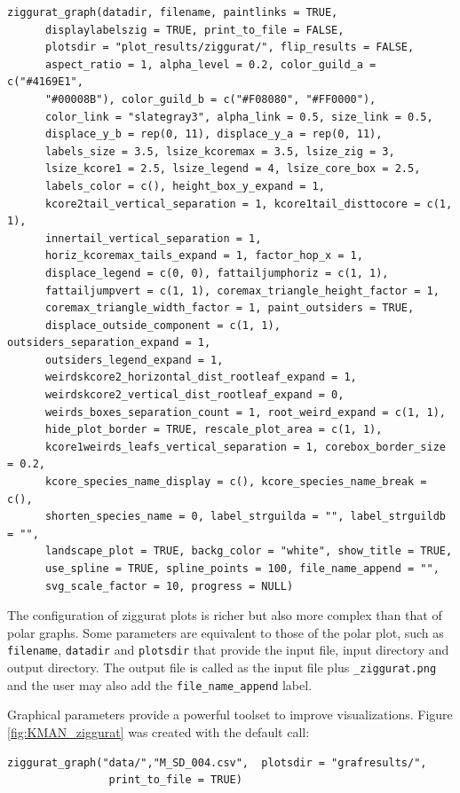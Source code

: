 \documentclass[12pt]{article}
\begin{document}
\fontsize{3.5mm}{3.5mm}\selectfont
\begin{verbatim}
ziggurat_graph(datadir, filename, paintlinks = TRUE,
	  displaylabelszig = TRUE, print_to_file = FALSE,
	  plotsdir = "plot_results/ziggurat/", flip_results = FALSE,
	  aspect_ratio = 1, alpha_level = 0.2, color_guild_a = c("#4169E1",
	  "#00008B"), color_guild_b = c("#F08080", "#FF0000"),
	  color_link = "slategray3", alpha_link = 0.5, size_link = 0.5,
	  displace_y_b = rep(0, 11), displace_y_a = rep(0, 11), 
	  labels_size = 3.5, lsize_kcoremax = 3.5, lsize_zig = 3, 
	  lsize_kcore1 = 2.5, lsize_legend = 4, lsize_core_box = 2.5, 
	  labels_color = c(), height_box_y_expand = 1, 
	  kcore2tail_vertical_separation = 1, kcore1tail_disttocore = c(1, 1), 
	  innertail_vertical_separation = 1,
	  horiz_kcoremax_tails_expand = 1, factor_hop_x = 1,
	  displace_legend = c(0, 0), fattailjumphoriz = c(1, 1),
	  fattailjumpvert = c(1, 1), coremax_triangle_height_factor = 1,
	  coremax_triangle_width_factor = 1, paint_outsiders = TRUE,
	  displace_outside_component = c(1, 1), outsiders_separation_expand = 1,
	  outsiders_legend_expand = 1,
	  weirdskcore2_horizontal_dist_rootleaf_expand = 1,
	  weirdskcore2_vertical_dist_rootleaf_expand = 0,
	  weirds_boxes_separation_count = 1, root_weird_expand = c(1, 1),
	  hide_plot_border = TRUE, rescale_plot_area = c(1, 1),
	  kcore1weirds_leafs_vertical_separation = 1, corebox_border_size = 0.2,
	  kcore_species_name_display = c(), kcore_species_name_break = c(),
	  shorten_species_name = 0, label_strguilda = "", label_strguildb = "",
	  landscape_plot = TRUE, backg_color = "white", show_title = TRUE,
	  use_spline = TRUE, spline_points = 100, file_name_append = "",
	  svg_scale_factor = 10, progress = NULL)
\end{verbatim}
\normalsize

The configuration of ziggurat plots is richer but also more complex than that of polar graphs. Some parameters
are equivalent to those of the polar plot, such as \texttt{filename}, \texttt{datadir} and \texttt{plotsdir} that
provide the input file, input directory and output directory. The output file is called as the input file
plus \texttt{\_ziggurat.png} and the user may also add the \texttt{file\_name\_append} label.

Graphical parameters provide a powerful toolset to improve visualizations. Figure \ref{fig:KMAN_ziggurat} was created with the
default call:

\fontsize{3.5mm}{3.5mm}\selectfont
\begin{verbatim}
ziggurat_graph("data/","M_SD_004.csv",  plotsdir = "grafresults/", 
                print_to_file = TRUE)
\end{verbatim}
\normalsize
\end{document}
